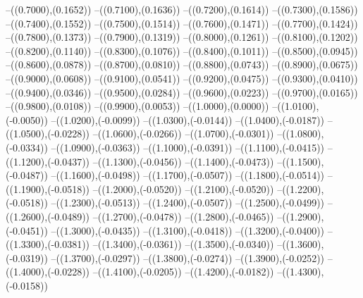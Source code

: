 {	--({\sx*(0.7000)},{\sy*(0.1652)})
	--({\sx*(0.7100)},{\sy*(0.1636)})
	--({\sx*(0.7200)},{\sy*(0.1614)})
	--({\sx*(0.7300)},{\sy*(0.1586)})
	--({\sx*(0.7400)},{\sy*(0.1552)})
	--({\sx*(0.7500)},{\sy*(0.1514)})
	--({\sx*(0.7600)},{\sy*(0.1471)})
	--({\sx*(0.7700)},{\sy*(0.1424)})
	--({\sx*(0.7800)},{\sy*(0.1373)})
	--({\sx*(0.7900)},{\sy*(0.1319)})
	--({\sx*(0.8000)},{\sy*(0.1261)})
	--({\sx*(0.8100)},{\sy*(0.1202)})
	--({\sx*(0.8200)},{\sy*(0.1140)})
	--({\sx*(0.8300)},{\sy*(0.1076)})
	--({\sx*(0.8400)},{\sy*(0.1011)})
	--({\sx*(0.8500)},{\sy*(0.0945)})
	--({\sx*(0.8600)},{\sy*(0.0878)})
	--({\sx*(0.8700)},{\sy*(0.0810)})
	--({\sx*(0.8800)},{\sy*(0.0743)})
	--({\sx*(0.8900)},{\sy*(0.0675)})
	--({\sx*(0.9000)},{\sy*(0.0608)})
	--({\sx*(0.9100)},{\sy*(0.0541)})
	--({\sx*(0.9200)},{\sy*(0.0475)})
	--({\sx*(0.9300)},{\sy*(0.0410)})
	--({\sx*(0.9400)},{\sy*(0.0346)})
	--({\sx*(0.9500)},{\sy*(0.0284)})
	--({\sx*(0.9600)},{\sy*(0.0223)})
	--({\sx*(0.9700)},{\sy*(0.0165)})
	--({\sx*(0.9800)},{\sy*(0.0108)})
	--({\sx*(0.9900)},{\sy*(0.0053)})
	--({\sx*(1.0000)},{\sy*(0.0000)})
	--({\sx*(1.0100)},{\sy*(-0.0050)})
	--({\sx*(1.0200)},{\sy*(-0.0099)})
	--({\sx*(1.0300)},{\sy*(-0.0144)})
	--({\sx*(1.0400)},{\sy*(-0.0187)})
	--({\sx*(1.0500)},{\sy*(-0.0228)})
	--({\sx*(1.0600)},{\sy*(-0.0266)})
	--({\sx*(1.0700)},{\sy*(-0.0301)})
	--({\sx*(1.0800)},{\sy*(-0.0334)})
	--({\sx*(1.0900)},{\sy*(-0.0363)})
	--({\sx*(1.1000)},{\sy*(-0.0391)})
	--({\sx*(1.1100)},{\sy*(-0.0415)})
	--({\sx*(1.1200)},{\sy*(-0.0437)})
	--({\sx*(1.1300)},{\sy*(-0.0456)})
	--({\sx*(1.1400)},{\sy*(-0.0473)})
	--({\sx*(1.1500)},{\sy*(-0.0487)})
	--({\sx*(1.1600)},{\sy*(-0.0498)})
	--({\sx*(1.1700)},{\sy*(-0.0507)})
	--({\sx*(1.1800)},{\sy*(-0.0514)})
	--({\sx*(1.1900)},{\sy*(-0.0518)})
	--({\sx*(1.2000)},{\sy*(-0.0520)})
	--({\sx*(1.2100)},{\sy*(-0.0520)})
	--({\sx*(1.2200)},{\sy*(-0.0518)})
	--({\sx*(1.2300)},{\sy*(-0.0513)})
	--({\sx*(1.2400)},{\sy*(-0.0507)})
	--({\sx*(1.2500)},{\sy*(-0.0499)})
	--({\sx*(1.2600)},{\sy*(-0.0489)})
	--({\sx*(1.2700)},{\sy*(-0.0478)})
	--({\sx*(1.2800)},{\sy*(-0.0465)})
	--({\sx*(1.2900)},{\sy*(-0.0451)})
	--({\sx*(1.3000)},{\sy*(-0.0435)})
	--({\sx*(1.3100)},{\sy*(-0.0418)})
	--({\sx*(1.3200)},{\sy*(-0.0400)})
	--({\sx*(1.3300)},{\sy*(-0.0381)})
	--({\sx*(1.3400)},{\sy*(-0.0361)})
	--({\sx*(1.3500)},{\sy*(-0.0340)})
	--({\sx*(1.3600)},{\sy*(-0.0319)})
	--({\sx*(1.3700)},{\sy*(-0.0297)})
	--({\sx*(1.3800)},{\sy*(-0.0274)})
	--({\sx*(1.3900)},{\sy*(-0.0252)})
	--({\sx*(1.4000)},{\sy*(-0.0228)})
	--({\sx*(1.4100)},{\sy*(-0.0205)})
	--({\sx*(1.4200)},{\sy*(-0.0182)})
	--({\sx*(1.4300)},{\sy*(-0.0158)})
}
